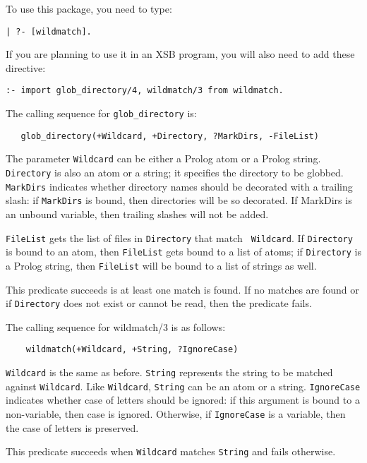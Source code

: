 To use this package, you need to type:
\begin{verbatim}
| ?- [wildmatch].  
\end{verbatim}
If you are planning to use it in an XSB program, you will also need to add
these directive:
\begin{verbatim}
:- import glob_directory/4, wildmatch/3 from wildmatch.
\end{verbatim}

The calling sequence for \verb|glob_directory| is:
\begin{verbatim}
   glob_directory(+Wildcard, +Directory, ?MarkDirs, -FileList)  
\end{verbatim}
The parameter {\tt Wildcard} can be either a Prolog atom or a Prolog
string. {\tt Directory} is also an atom or a string; it specifies the
directory to be globbed. {\tt MarkDirs} indicates whether directory names
should be decorated with a trailing slash: if {\tt MarkDirs} is bound, then
directories will be so decorated. If MarkDirs is an unbound variable, then
trailing slashes will not be added.

{\tt FileList} gets the list of files in {\tt Directory} that match {\tt
  Wildcard}.  If {\tt Directory} is bound to an atom, then {\tt FileList}
gets bound to a list of atoms; if {\tt Directory} is a Prolog string, then
{\tt FileList} will be bound to a list of strings as well.

This predicate succeeds is at least one match is found. If no matches are
found or if {\tt Directory} does not exist or cannot be read, then the
predicate fails.

The calling sequence for wildmatch/3 is as follows:
\begin{verbatim}
    wildmatch(+Wildcard, +String, ?IgnoreCase)  
\end{verbatim}
{\tt Wildcard} is the same as before. {\tt String} represents the string to
be matched against {\tt Wildcard}. Like {\tt Wildcard}, {\tt String} can be
an atom or a string. {\tt IgnoreCase} indicates whether case of letters
should be ignored: if this argument is bound to a non-variable, then case
is ignored. Otherwise, if {\tt IgnoreCase} is a variable, then the case of
letters is preserved.

This predicate succeeds when {\tt Wildcard} matches {\tt String} and fails
otherwise.




